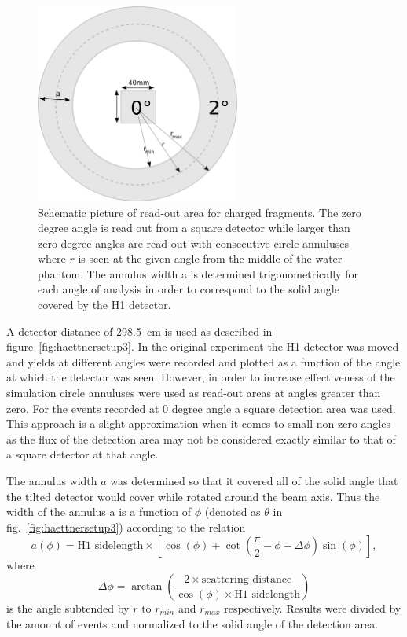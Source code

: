 \begin{figure}[!h] 
\begin{center}
\includegraphics[width=0.6\textwidth]{images/annulus.png}  
\caption{\label{fig:annulusesExplained} Schematic picture of read-out area for charged fragments. The zero degree angle is read out from a square detector while larger than zero degree angles are read out with consecutive circle annuluses where $r$ is seen at the given angle from the middle of the water phantom. The annulus width a is determined trigonometrically for each angle of analysis in order to correspond to the solid angle covered by the H1 detector.}
\end{center}
\end{figure}

A detector distance of 298.5~cm is used as described in figure~\ref{fig:haettnersetup3}. In the original experiment the H1 detector was moved and yields at different angles were recorded and plotted as a function of the angle at which the detector was seen. However, in order to increase effectiveness of the simulation circle annuluses were used as read-out areas at angles greater than zero. For the events recorded at 0 degree angle a square detection area was used. This approach is a slight approximation when it comes to small non-zero angles as the flux of the detection area may not be considered exactly similar to that of a square detector at that angle.

The annulus width $a$ was determined so that it covered all of the solid angle that the tilted detector would cover while rotated around the beam axis. Thus the width of the annulus a is a function of $\phi$ (denoted as $\theta$ in fig.~\ref{fig:haettnersetup3}) according to the relation \begin{equation}a(\phi) = \text{H1 sidelength} \times [\cos(\phi)+ \cot(\frac{\pi}{2} - \phi - \Delta\phi)\sin(\phi)],\end{equation}where \begin{equation}\Delta\phi = \arctan\left(\frac{2 \times \text{scattering distance}}{\cos(\phi) \times \text{H1 sidelength}}\right)\end{equation} is the angle subtended by $r$ to $r_{min}$ and $r_{max}$ respectively.
Results were divided by the amount of events and normalized to the solid angle of the detection area.

